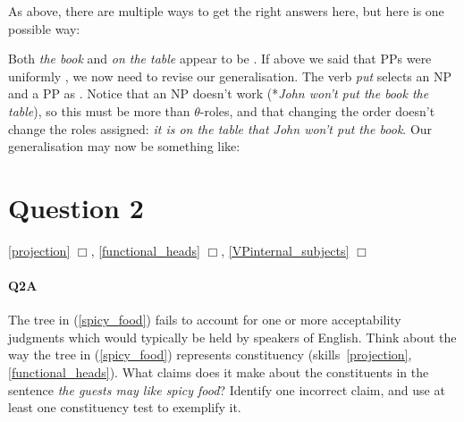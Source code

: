 \documentclass{article}
\begin{document}
\begin{answer}
{
As above, there are multiple ways to get the right answers here, but here is one possible way:
\begin{exe}
\end{exe}
Both \emph{the book} and \emph{on the table} appear to be .
If above we said that PPs were uniformly , we now need to revise our generalisation.
The verb \emph{put} selects an NP  and a PP  as .
Notice that an NP  doesn't work (*\emph{John won't put the book the table}), so this must be more than $\theta{}$-roles, and that changing the order doesn't change the roles assigned: \emph{it is on the table that John won't put the book}.
Our generalisation may now be something like:
\begin{exe}
\end{exe}   
}
\end{answer}

\section*{Question 2}
\hfill{} \ref{projection} $\Box$, \ref{functional_heads} $\Box$, \ref{VPinternal_subjects} $\Box$

\paragraph{Q2A} The tree in (\ref{spicy_food}) fails to account for one or more acceptability judgments which would typically be held by speakers of English.
Think about the way the tree in (\ref{spicy_food}) represents constituency (skills~\ref{projection}, \ref{functional_heads}).
What claims does it make about the constituents in the sentence \emph{the guests may like spicy food}? Identify one incorrect claim, and use at least one constituency test to exemplify it.
\end{document}
